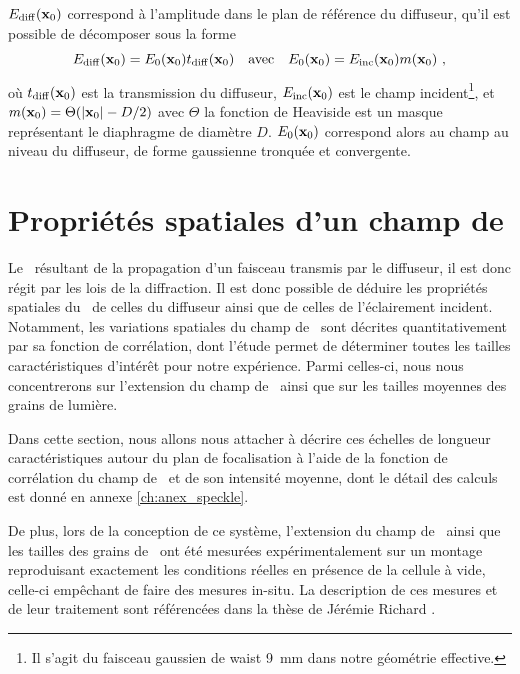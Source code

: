 $E_{\mathrm{diff}} (\mathbf{x}_0)$ correspond à l'amplitude dans le plan de référence du diffuseur, qu'il est possible de décomposer sous la forme 
\begin{equation}
E_{\mathrm{diff}}(\mathbf{x}_0)=E_0(\mathbf{x}_0) t_{\mathrm{diff}}(\mathbf{x}_0) \quad \text{avec} \quad E_0(\mathbf{x}_0) = E_\mathrm{inc} (\mathbf{x}_0) m(\mathbf{x}_0) \text{ ,}
\end{equation}
où $t_{\mathrm{diff}}(\mathbf{x}_0)$ est la transmission du diffuseur, $E_{\mathrm{inc}}(\mathbf{x}_0)$ est le champ incident\footnote{Il s'agit du faisceau gaussien de waist \SI{9}{\milli\metre} dans notre géométrie effective.}, et $m(\mathbf{x}_0)=\Theta(\left| \mathbf{x}_0 \right| - D/2)$ avec $\Theta$ la fonction de Heaviside est un masque représentant le diaphragme de diamètre $D$. $E_0(\mathbf{x}_0)$ correspond alors au champ au niveau du diffuseur, de forme gaussienne tronquée et convergente.


\section{Propriétés spatiales d'un champ de \speckle}
\label{sc:speckle_correlation}

Le \speckle\ résultant de la propagation d'un faisceau transmis par le diffuseur, il est donc régit par les lois de la diffraction. Il est donc possible de déduire les propriétés spatiales du \speckle\ de celles du diffuseur ainsi que de celles de l'éclairement incident. Notamment, les variations spatiales du champ de \speckle\ sont décrites quantitativement par sa fonction de corrélation, dont l'étude permet de déterminer toutes les tailles caractéristiques d'intérêt pour notre expérience. Parmi celles-ci, nous nous concentrerons sur l'extension du champ de \speckle\ ainsi que sur les tailles moyennes des grains de lumière. 

Dans cette section, nous allons nous attacher à décrire ces échelles de longueur caractéristiques autour du plan de focalisation à l'aide de la fonction de corrélation du champ de \speckle\ et de son intensité moyenne, dont le détail des calculs est donné en annexe \ref{ch:anex_speckle}. 

De plus, lors de la conception de ce système, l'extension du champ de \speckle\ ainsi que les tailles des grains de \speckle\ ont été mesurées expérimentalement sur un montage reproduisant exactement les conditions réelles en présence de la cellule à vide, celle-ci empêchant de faire des mesures in-situ. La description de ces mesures et de leur traitement sont référencées dans la thèse de Jérémie Richard \citep{richard2015propagation}.




